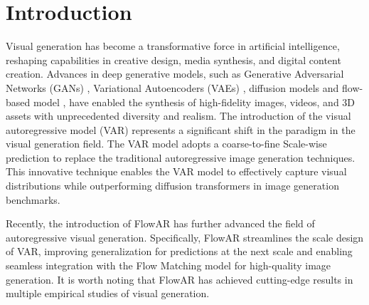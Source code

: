 \section{Introduction}\label{sec:introduction}

Visual generation has become a transformative force in artificial intelligence, reshaping capabilities in creative design, media synthesis, and digital content creation. Advances in deep generative models, such as Generative Adversarial Networks (GANs) \cite{gpm+20}, Variational Autoencoders (VAEs) \cite{doe16}, diffusion models \cite{hja20,ssk+20} and flow-based model \cite{kd18}, have enabled the synthesis of high-fidelity images, videos, and 3D assets with unprecedented diversity and realism. The introduction of the visual autoregressive model (VAR) \cite{tjy+24} represents a significant shift in the paradigm in the visual generation field. The VAR model adopts a coarse-to-fine Scale-wise prediction to replace the traditional autoregressive image generation techniques. This innovative technique enables the VAR model to effectively capture visual distributions while outperforming diffusion transformers in image generation benchmarks.

Recently, the introduction of FlowAR \cite{ryh+24} has further advanced the field of autoregressive visual generation. Specifically, FlowAR streamlines the scale design of VAR, improving generalization for predictions at the next scale and enabling seamless integration with the Flow Matching model \cite{lgl23} for high-quality image generation. It is worth noting that FlowAR has achieved cutting-edge results in multiple empirical studies of visual generation.


